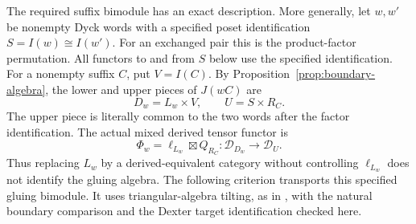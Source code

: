 \documentclass[11pt]{article}
\theoremstyle{definition}
\begin{document}
The required suffix bimodule has an exact description. More generally,
let $w,w'$ be nonempty Dyck words with a specified poset identification
$S=I(w)\cong I(w')$. For an exchanged pair this is the product-factor
permutation. All functors to and from $S$ below use the specified
identification. For a nonempty suffix $C$, put $V=I(C)$.
By Proposition~\ref{prop:boundary-algebra}, the lower and upper
pieces of $J(wC)$ are
\[
 D_w=L_w\times V,\qquad U=S\times R_C.
\]
The upper piece is literally common to the two words after the
factor identification. The actual mixed derived tensor functor is
\begin{equation}\label{eq:suffix-bimodule}
 \Phi_w=\ell_{L_w}\boxtimes Q_{R_C}:
 \mathcal D_{D_w}\longrightarrow\mathcal D_U.
\end{equation}
Thus replacing $L_w$ by a derived-equivalent category without
controlling $\ell_{L_w}$ does not identify the gluing algebra.
The following criterion transports this specified gluing bimodule.
It uses triangular-algebra tilting, as in
\cite[Theorems 4.5 and 4.9]{LadkaniTriangular}, with the natural
boundary comparison and the Dexter target identification checked here.
\end{document}
